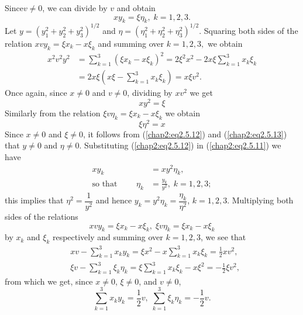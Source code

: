 Since\pageoriginale $v \neq 0$, we can divide by $v$ and obtain
\begin{equation*}
xy_k = \xi \eta_k, \; k = 1,2,3.
\tag{2.5.11}\label{chap2:eq2.5.11} 
\end{equation*}
Let $y = (y^2_1 + y^2_2 + y^2_3)^{1/2}$ and $\eta = (\eta^2_1 + \eta^2_2 + \eta^2_3)^{1/2}$. Squaring both sides of the relation $xvy_k = \xi x_k - x\xi_k$ and summing over $k =1,2,3,$ we obtain
\begin{align*}
x^2 v^2 y^2 & = \sum\limits^3_{k=1} (\xi x_k - x\xi_k)^2 = 2 \xi^2 x^2 - 2 x \xi \sum\limits^3_{k=1} x_k\xi_k\\
& = 2x \xi (x \xi - \sum\limits^3_{k=1} x_k \xi_k) = x \xi v^2. 
\end{align*}
Once again, since $x \neq 0$ and $v \neq 0$, dividing by $x v^2$ we get 
\begin{equation*}
xy^2 = \xi\tag{2.5.12}\label{chap2:eq2.5.12} 
\end{equation*}
Similarly from the relation $\xi v \eta_k = \xi x_k - x \xi_k$ we obtain
\begin{equation*}
\xi \eta^2 = x\tag{2.5.13}\label{chap2:eq2.5.13} 
\end{equation*}
Since $x \neq 0$ and $\xi \neq 0$, it follows from (\ref{chap2:eq2.5.12}) and (\ref{chap2:eq2.5.13}) that $y \neq 0$ and $\eta \neq 0$. Substituting (\ref{chap2:eq2.5.12}) in (\ref{chap2:eq2.5.11}) we have
\begin{align*}
xy_k & = x y^2 \eta_k,\\
\text{so that } \qquad \eta_k & = \frac{y_k}{y^2}, \; k =1 ,2,3;
\end{align*}
this implies that $\eta^2 = \dfrac{1}{y^2}$ and hence $y_k = y^2 \eta_k =\dfrac{\eta_k}{\eta^2}$, $k = 1,2,3$. Multiplying both sides of the relations
$$
xvy_k = \xi x_k - x\xi_k, \; \xi v \eta_k = \xi x_k - x \xi_k
$$\pageoriginale
by $x_k$ and $\xi_k$ respectively and summing over $k = 1,2,3$, we see that
\begin{align*}
& xv - \sum\limits^3_{k=1} x_k y_k = \xi x^2 - x \sum\limits^3_{k=1} x_k \xi_k =\frac{1}{2} x v^2, \\
& \xi v -  \sum\limits^3_{k=1} \xi_k \eta_k = \xi \sum\limits^3_{k=1} x_k \xi_k - x \xi^2 = - \frac{1}{2} \xi v^2, 
\end{align*}
from which we get, since $x \neq 0$, $\xi \neq 0$, and $v \neq 0$,
\begin{equation*}
\sum\limits^3_{k=1} x_k y_k =\frac{1}{2} v, \; \sum\limits^3_{k=1} \xi_k \eta_k = - \frac{1}{2} v. \tag{2.5.14}\label{chap2:eq2.5.14} 
\end{equation*}
